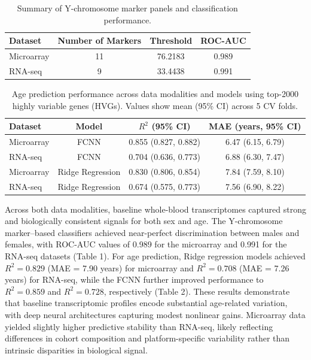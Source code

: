 \documentclass[
  12pt]{article}
\begin{document}
\begin{table}[ht]
\centering
\caption{Summary of Y-chromosome marker panels and classification performance.}
\begin{tabular}{lccc}
\hline
\textbf{Dataset} & \textbf{Number of Markers} & \textbf{Threshold} & \textbf{ROC-AUC} \\
\hline
Microarray & 11 & 76.2183 & 0.989 \\
RNA-seq & 9 & 33.4438 & 0.991 \\
\hline
\end{tabular}
\label{tab:sex_marker_auc}
\end{table}

\begin{table}[ht]
\centering
\caption{Age prediction performance across data modalities and models using top-2000 highly variable genes (HVGs). Values show mean (95\% CI) across 5 CV folds.}
\begin{tabular}{lccc}
\hline
\textbf{Dataset} & \textbf{Model} & \textbf{$R^2$ (95\% CI)} & \textbf{MAE (years, 95\% CI)} \\
\hline
Microarray & FCNN & 0.855 (0.827, 0.882) & 6.47 (6.15, 6.79) \\
RNA-seq & FCNN & 0.704 (0.636, 0.773) & 6.88 (6.30, 7.47) \\
Microarray & Ridge Regression & 0.830 (0.806, 0.854) & 7.84 (7.59, 8.10) \\
RNA-seq & Ridge Regression & 0.674 (0.575, 0.773) & 7.56 (6.90, 8.22) \\
\hline
\end{tabular}
\label{tab:age_prediction}
\end{table}

Across both data modalities, baseline whole-blood transcriptomes captured strong and biologically consistent signals for both sex and age. The Y-chromosome marker--based classifiers achieved near-perfect discrimination between males and females, with ROC-AUC values of 0.989 for the microarray and 0.991 for the RNA-seq datasets (Table 1). For age prediction, Ridge regression models achieved \(R^2 = 0.829\) (MAE = 7.90 years) for microarray and \(R^2 = 0.708\) (MAE = 7.26 years) for RNA-seq, while the FCNN further improved performance to \(R^2 = 0.859\) and \(R^2 = 0.728\), respectively (Table 2). These results demonstrate that baseline transcriptomic profiles encode substantial age-related variation, with deep neural architectures capturing modest nonlinear gains. Microarray data yielded slightly higher predictive stability than RNA-seq, likely reflecting differences in cohort composition and platform-specific variability rather than intrinsic disparities in biological signal.
\end{document}
